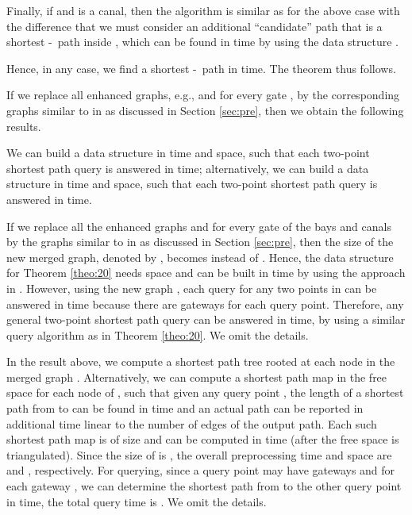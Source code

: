 \documentclass[english,runningheads,11pt]{llncs}
\def\st{-}
\newenvironment{proof}{\noindent {\textbf{Proof:}}\rm}{\hfill \rm}
\begin{document}
\begin{proof}
\begin{description}
\end{description}


Finally, if  and  is a canal, then the algorithm is similar as for
the above case with the difference that we must consider an additional
``candidate'' path that is a shortest \st\ path inside , which
can be found in  time by using the data structure .

Hence, in any case, we find a shortest \st\ path in  time.
The theorem thus follows.
\end{proof}

If we replace all enhanced graphs, e.g.,  and  for
every gate , by the corresponding graphs similar to  in \cite{ref:ChenSh00}
as discussed in Section \ref{sec:pre}, then we obtain the following results.

\begin{corollary}
We can build a data structure in  time and space,
such that each two-point shortest path query is answered in
 time; alternatively,
we can build a data structure in  time and
 space, such that each two-point shortest path query is
answered in  time.
\end{corollary}
\begin{proof}
If we replace all the enhanced graphs  and  for every gate  of the
bays and canals by the graphs similar to  in \cite{ref:ChenSh00}
as discussed in Section \ref{sec:pre}, then the size of the new merged graph,
denoted by , becomes  instead of
.
Hence, the data structure for Theorem \ref{theo:20}
needs  space and can be built in 
time by using the approach in \cite{ref:ChenSh00}.
However, using the new graph , each query for any two points in
 can be answered in  time because there are  gateways for each query point. Therefore, any general two-point
shortest path query can be answered in  time, by
using a similar query algorithm as in Theorem \ref{theo:20}. We omit the details.

In the result above,
we compute a shortest path tree rooted at each node in the merged graph .
Alternatively, we can compute a shortest path map in the free space  for
each node  of , such that given any query point
, the length of a shortest path from  to  can be found in
 time and an actual path can be reported in additional
time linear to the number of edges of the output path.
Each such shortest path map is of size  and can be computed in
 time
\cite{ref:ChenA11ESA,ref:ChenCo12arXiv,ref:ChenL113STACS} (after
the free space  is triangulated). Since the size
of  is , the overall preprocessing time
and space are  and , respectively. For querying, since
a query point may have
 gateways and for each gateway , we can determine the
shortest path from  to the other query point in  time,
the total query time is . We omit the details.
\end{proof}
\end{document}
